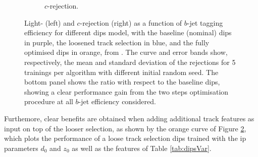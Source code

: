 \begin{figure}[h!]
\begin{subfigure}[b]{0.48\textwidth}
      \caption{$c$-rejection.} 
      \label{fig:dipsOptRocC}
  \end{subfigure}
  \caption{Light- (left) and $c$-rejection (right) as a function of $b$-jet tagging efficiency for different \gls{dips} model, with the baseline (nominal) \gls{dips} in purple, the loosened track selection in blue, and the fully optimised \gls{dips} in orange, from \cite{ATL-PHYS-PUB-2020-014}. The curve and error bands show, respectively, the mean and standard deviation of the rejections for 5 trainings per algorithm with different initial random seed. The bottom panel shows the ratio with respect to the baseline \gls{dips}, showing a clear performance gain from the two steps optimisation procedure at all $b$-jet efficiency considered.}
  \label{fig:dipsOptRoc}
\end{figure} 

Furthemore, clear benefits are obtained when adding additional track features as input on top of the looser selection, as shown by the orange curve of Figure \ref{fig:dipsOptRoc}, which plots the performance of a loose track selection \gls{dips} trained with the \gls{ip} parameters $d_0$ and $z_0$ as well as the features of Table \ref{tab:dipsVar}.


